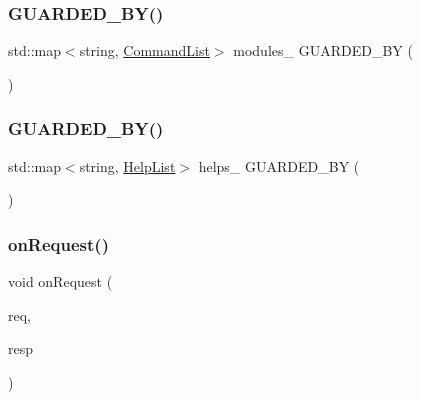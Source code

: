 \subsubsection{\texorpdfstring{G\+U\+A\+R\+D\+E\+D\+\_\+\+B\+Y()}{GUARDED\_BY()}\hspace{0.1cm}{\footnotesize\ttfamily [1/2]}}
{\footnotesize\ttfamily std\+::map$<$string, \hyperlink{classmuduo_1_1net_1_1Inspector_a00ae736a47d9b5825c815a1c8aeeaeab}{Command\+List}$>$ modules\+\_\+ G\+U\+A\+R\+D\+E\+D\+\_\+\+BY (\begin{DoxyParamCaption}\item[{\hyperlink{classmuduo_1_1net_1_1Inspector_a6e1bf1809a42f40f1a21178dc6620a6f}{mutex\+\_\+}}]{ }\end{DoxyParamCaption})\hspace{0.3cm}{\ttfamily [private]}}

\mbox{\label{classmuduo_1_1net_1_1Inspector_a2c36da39cb9d138e80cda07a07f57072}} 
\subsubsection{\texorpdfstring{G\+U\+A\+R\+D\+E\+D\+\_\+\+B\+Y()}{GUARDED\_BY()}\hspace{0.1cm}{\footnotesize\ttfamily [2/2]}}
{\footnotesize\ttfamily std\+::map$<$string, \hyperlink{classmuduo_1_1net_1_1Inspector_a45483c7152afba31eaf21e58681f619e}{Help\+List}$>$ helps\+\_\+ G\+U\+A\+R\+D\+E\+D\+\_\+\+BY (\begin{DoxyParamCaption}\item[{\hyperlink{classmuduo_1_1net_1_1Inspector_a6e1bf1809a42f40f1a21178dc6620a6f}{mutex\+\_\+}}]{ }\end{DoxyParamCaption})\hspace{0.3cm}{\ttfamily [private]}}

\mbox{\label{classmuduo_1_1net_1_1Inspector_ab4136340ef5241a1d886a2fdb6a64f81}} 
\subsubsection{\texorpdfstring{on\+Request()}{onRequest()}}
{\footnotesize\ttfamily void on\+Request (\begin{DoxyParamCaption}\item[{const \hyperlink{classmuduo_1_1net_1_1HttpRequest}{Http\+Request} \&}]{req,  }\item[{\hyperlink{classmuduo_1_1net_1_1HttpResponse}{Http\+Response} $\ast$}]{resp }\end{DoxyParamCaption})\hspace{0.3cm}{\ttfamily [private]}}

